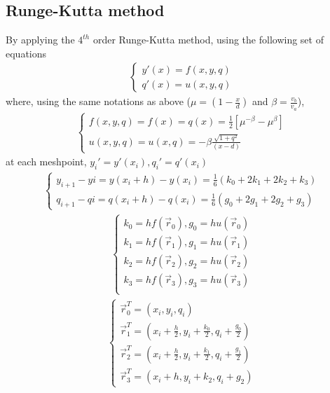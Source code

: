 \documentclass[a4paper, 12pt]{article}
\begin{document}
\subsection{Runge-Kutta method}
By applying the $4^{th}$ order Runge-Kutta method, using the following set of equations
\begin{align}
	\begin{cases}
		y'(x)= f(x,y,q)\\
		q'(x)= u(x,y,q)
	\end{cases}
\end{align}
	where, using the same notations as above ($\mu =(1-\frac{x}{d})$ and $\beta = \frac{v_b}{v_a}$),
\begin{align}
	\begin{cases}
		f(x,y,q) = f(x) = q(x) = \frac{1}{2} [ \mu^{-\beta} - \mu^{\beta}] \\
		u(x,y,q) = u(x,q) = -\beta \frac{\sqrt{1+q^2}}{(x-d)}
	\end{cases} \label{qEquation}
\end{align}
at each meshpoint, $y_i' = y'(x_i), q_i' = q'(x_i)$
\begin{align}
	\begin{cases}
		y_{i+1} - y{i} = y(x_i+h) - y(x_i) = \frac{1}{6} (k_0 +2k_1 + 2k_2+k_3) \\
		q_{i+1} - q{i} = q(x_i+h) - q(x_i) = \frac{1}{6} (g_0 +2g_1 + 2g_2+g_3)
	\end{cases} \label{IncrementEquation}
\end{align}
\begin{align}
	\begin{cases}
		k_0= hf(\vec{r}_0), g_0 = hu(\vec{r}_0)\\
		k_1= hf(\vec{r}_1), g_1 = hu(\vec{r}_1)\\
		k_2= hf(\vec{r}_2), g_2 = hu(\vec{r}_2)\\
		k_3= hf(\vec{r}_3), g_3 = hu(\vec{r}_3)\\
	\end{cases}
\end{align}
\begin{align}
	\begin{cases}
		\vec{r}_0^T = (x_i, y_i, q_i) \\
		\vec{r}_1^T = (x_i+\frac{h}{2}, y_i+\frac{k_0}{2}, q_i+\frac{g_0}{2}) \\
		\vec{r}_2^T = (x_i+\frac{h}{2}, y_i+\frac{k_1}{2}, q_i+\frac{g_1}{2}) \\
		\vec{r}_3^T = (x_i+h, y_i+k_2, q_i+g_2)
	\end{cases}
	\label{MeshpointCoordinates}
\end{align}
\end{document}
